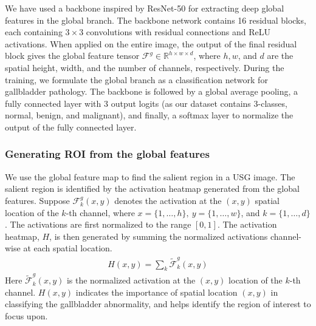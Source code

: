 \documentclass[twocolumn,final]{elsarticle}
\begin{document}
We have used a backbone inspired by ResNet-50 \citep{resnet} for extracting deep global features in the global branch. The backbone network contains 16 residual blocks, each containing $3\times3$ convolutions with residual connections and ReLU activations. When applied on the entire image, the output of the final residual block gives the global feature tensor $\mathcal{F}^g \in \mathbb{R}^{h \times w \times d}$, where $h, w$, and $d$ are the spatial height, width, and the number of channels, respectively. During the training, we formulate the global branch as a classification network for gallbladder pathology. The backbone is followed by a global average pooling, a fully connected layer with 3 output logits (as our dataset contains 3-classes, normal, benign, and malignant), and finally, a softmax layer to normalize the output of the fully connected layer. 

\subsubsection{Generating ROI from the global features} 
We use the global feature map to find the salient region in a USG image. The salient region is identified by the activation heatmap generated from the global features. Suppose $\mathcal{F}^g_k(x,y)$ denotes the activation at the $(x,y)$ spatial location of the $k$-th channel, where $x=\{1,\ldots, h\},~ y=\{1,\ldots, w\}$, and $k=\{1,\ldots, d\}$. The activations are first normalized to the range $[0,1]$. The activation heatmap, $H$, is then generated by summing the normalized activations channel-wise at each spatial location. 
\begin{align}
    H(x,y) = \sum_k {\mathcal{\widetilde{F}}^g_k(x,y)}
\end{align}
Here $\mathcal{\widetilde{F}}^g_k(x,y)$ is the normalized activation at the $(x,y)$ location of the $k$-th channel. $H(x,y)$ indicates the importance of spatial location $(x,y)$ in classifying the gallbladder abnormality, and helps identify the region of interest to focus upon. 
\end{document}
